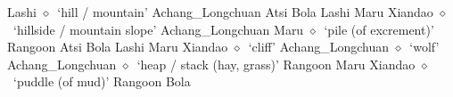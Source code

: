 \hspace{1ex}
         Lashi 
\hspace{1ex}
         $\diamond$~`hill / mountain'
         Achang\_Longchuan 
\hspace{1ex}
         Atsi 
\hspace{1ex}
         Bola 
\hspace{1ex}
         Lashi 
\hspace{1ex}
         Maru 
\hspace{1ex}
         Xiandao 
\hspace{1ex}
         $\diamond$~`hillside / mountain slope'
         Achang\_Longchuan 
\hspace{1ex}
         Maru 
\hspace{1ex}
         $\diamond$~`pile (of excrement)'
         Rangoon 
\hspace{1ex}
         Atsi 
\hspace{1ex}
         Bola 
\hspace{1ex}
         Lashi 
\hspace{1ex}
         Maru 
\hspace{1ex}
         Xiandao 
\hspace{1ex}
         $\diamond$~`cliff'
         Achang\_Longchuan 
\hspace{1ex}
         $\diamond$~`wolf'
         Achang\_Longchuan 
\hspace{1ex}
         $\diamond$~`heap / stack (hay, grass)'
         Rangoon 
\hspace{1ex}
         Maru 
\hspace{1ex}
         Xiandao 
\hspace{1ex}
         $\diamond$~`puddle (of mud)'
         Rangoon 
\hspace{1ex}
         Bola 
\hspace{1ex}
